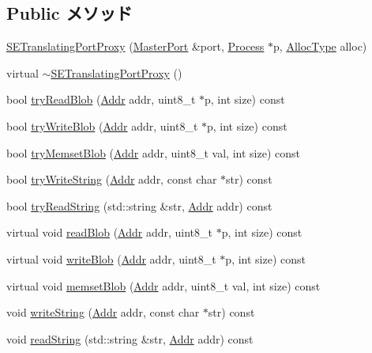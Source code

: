 \subsection*{Public メソッド}
\begin{DoxyCompactItemize}
\item 
\hyperlink{classSETranslatingPortProxy_a53496e09221903975c88c46e55e99d73}{SETranslatingPortProxy} (\hyperlink{classMasterPort}{MasterPort} \&port, \hyperlink{classProcess}{Process} $\ast$p, \hyperlink{classSETranslatingPortProxy_ac60b92a362d833ef83dd912047a36afe}{AllocType} alloc)
\item 
virtual \hyperlink{classSETranslatingPortProxy_a4e9827ea13aa7de2eb20fb37cf6d0edb}{$\sim$SETranslatingPortProxy} ()
\item 
bool \hyperlink{classSETranslatingPortProxy_aca06672df50af8d578c89cfe876c91ee}{tryReadBlob} (\hyperlink{base_2types_8hh_af1bb03d6a4ee096394a6749f0a169232}{Addr} addr, uint8\_\-t $\ast$p, int size) const 
\item 
bool \hyperlink{classSETranslatingPortProxy_a0f56f41d9a37cca029fb3159d3561e5c}{tryWriteBlob} (\hyperlink{base_2types_8hh_af1bb03d6a4ee096394a6749f0a169232}{Addr} addr, uint8\_\-t $\ast$p, int size) const 
\item 
bool \hyperlink{classSETranslatingPortProxy_aa7b620f0665adb8f264d5a197cd34962}{tryMemsetBlob} (\hyperlink{base_2types_8hh_af1bb03d6a4ee096394a6749f0a169232}{Addr} addr, uint8\_\-t val, int size) const 
\item 
bool \hyperlink{classSETranslatingPortProxy_a7388a80b5c85481ecf18bac69ea2fc34}{tryWriteString} (\hyperlink{base_2types_8hh_af1bb03d6a4ee096394a6749f0a169232}{Addr} addr, const char $\ast$str) const 
\item 
bool \hyperlink{classSETranslatingPortProxy_a566bb321a4a4657816925b1421a8abfa}{tryReadString} (std::string \&str, \hyperlink{base_2types_8hh_af1bb03d6a4ee096394a6749f0a169232}{Addr} addr) const 
\item 
virtual void \hyperlink{classSETranslatingPortProxy_a5580fe869fe8ffcffe2660eaa2c6276a}{readBlob} (\hyperlink{base_2types_8hh_af1bb03d6a4ee096394a6749f0a169232}{Addr} addr, uint8\_\-t $\ast$p, int size) const 
\item 
virtual void \hyperlink{classSETranslatingPortProxy_ad2a72c978fca534c6afc8b0f6ac2fe19}{writeBlob} (\hyperlink{base_2types_8hh_af1bb03d6a4ee096394a6749f0a169232}{Addr} addr, uint8\_\-t $\ast$p, int size) const 
\item 
virtual void \hyperlink{classSETranslatingPortProxy_ab8c719f72992ac0e0b2b9a2c464a1456}{memsetBlob} (\hyperlink{base_2types_8hh_af1bb03d6a4ee096394a6749f0a169232}{Addr} addr, uint8\_\-t val, int size) const 
\item 
void \hyperlink{classSETranslatingPortProxy_a6b750ce66a82c7f9576c4fcde9bb7f54}{writeString} (\hyperlink{base_2types_8hh_af1bb03d6a4ee096394a6749f0a169232}{Addr} addr, const char $\ast$str) const 
\item 
void \hyperlink{classSETranslatingPortProxy_a31157b758c97adefcb8b93b6d5587dda}{readString} (std::string \&str, \hyperlink{base_2types_8hh_af1bb03d6a4ee096394a6749f0a169232}{Addr} addr) const 
\end{DoxyCompactItemize}
